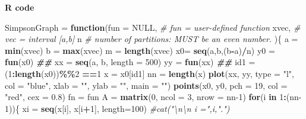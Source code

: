 \documentclass[
]{book}
\newenvironment{Shaded}{\begin{snugshade}}{\end{snugshade}}
\newcommand{\AttributeTok}[1]{\textcolor[rgb]{0.13,0.29,0.53}{#1}}
\newcommand{\CommentTok}[1]{\textcolor[rgb]{0.56,0.35,0.01}{\textit{#1}}}
\newcommand{\ConstantTok}[1]{\textcolor[rgb]{0.56,0.35,0.01}{#1}}
\newcommand{\ControlFlowTok}[1]{\textcolor[rgb]{0.13,0.29,0.53}{\textbf{#1}}}
\newcommand{\DecValTok}[1]{\textcolor[rgb]{0.00,0.00,0.81}{#1}}
\newcommand{\DocumentationTok}[1]{\textcolor[rgb]{0.56,0.35,0.01}{\textbf{\textit{#1}}}}
\newcommand{\FloatTok}[1]{\textcolor[rgb]{0.00,0.00,0.81}{#1}}
\newcommand{\FunctionTok}[1]{\textcolor[rgb]{0.13,0.29,0.53}{\textbf{#1}}}
\newcommand{\NormalTok}[1]{#1}
\newcommand{\OtherTok}[1]{\textcolor[rgb]{0.56,0.35,0.01}{#1}}
\newcommand{\SpecialCharTok}[1]{\textcolor[rgb]{0.81,0.36,0.00}{\textbf{#1}}}
\newcommand{\StringTok}[1]{\textcolor[rgb]{0.31,0.60,0.02}{#1}}
\begin{document}
\textbf{R code}

\begin{Shaded}
\begin{Highlighting}[]
\NormalTok{SimpsonGraph }\OtherTok{=} \ControlFlowTok{function}\NormalTok{(}\AttributeTok{fun =} \ConstantTok{NULL}\NormalTok{,     }\CommentTok{\# fun = user{-}defined function}
\NormalTok{                        xvec,           }\CommentTok{\# vec = interval [a,b]}
\NormalTok{                        n               }\CommentTok{\# number of partitions: MUST be an even number. }
\NormalTok{                        )\{}
\NormalTok{  a }\OtherTok{=} \FunctionTok{min}\NormalTok{(xvec)}
\NormalTok{  b }\OtherTok{=} \FunctionTok{max}\NormalTok{(xvec)}
\NormalTok{  m }\OtherTok{=} \FunctionTok{length}\NormalTok{(xvec)}
\NormalTok{  x0}\OtherTok{=} \FunctionTok{seq}\NormalTok{(a,b,(b}\SpecialCharTok{{-}}\NormalTok{a)}\SpecialCharTok{/}\NormalTok{n)}
\NormalTok{  y0 }\OtherTok{=} \FunctionTok{fun}\NormalTok{(x0)}
  \DocumentationTok{\#\#}
\NormalTok{  xx }\OtherTok{=} \FunctionTok{seq}\NormalTok{(a, b, }\AttributeTok{length =} \DecValTok{500}\NormalTok{)}
\NormalTok{  yy }\OtherTok{=} \FunctionTok{fun}\NormalTok{(xx)}
  \DocumentationTok{\#\#}
\NormalTok{  id1 }\OtherTok{=}\NormalTok{ (}\DecValTok{1}\SpecialCharTok{:}\FunctionTok{length}\NormalTok{(x0))}\SpecialCharTok{\%\%}\DecValTok{2} \SpecialCharTok{==}\DecValTok{1}
\NormalTok{  x }\OtherTok{=}\NormalTok{ x0[id1]}
\NormalTok{  nn }\OtherTok{=} \FunctionTok{length}\NormalTok{(x)}
  \FunctionTok{plot}\NormalTok{(xx, yy, }\AttributeTok{type =} \StringTok{"l"}\NormalTok{, }\AttributeTok{col =} \StringTok{"blue"}\NormalTok{, }\AttributeTok{xlab =} \StringTok{""}\NormalTok{, }\AttributeTok{ylab =} \StringTok{""}\NormalTok{, }\AttributeTok{main =} \StringTok{""}\NormalTok{)}
  \FunctionTok{points}\NormalTok{(x0, y0, }\AttributeTok{pch =} \DecValTok{19}\NormalTok{, }\AttributeTok{col =} \StringTok{"red"}\NormalTok{, }\AttributeTok{cex =} \FloatTok{0.8}\NormalTok{)}
\NormalTok{  fn }\OtherTok{=}\NormalTok{ fun}
\NormalTok{  A }\OtherTok{=} \FunctionTok{matrix}\NormalTok{(}\DecValTok{0}\NormalTok{, }\AttributeTok{ncol =} \DecValTok{3}\NormalTok{, }\AttributeTok{nrow =}\NormalTok{ nn}\DecValTok{{-}1}\NormalTok{)}
  \ControlFlowTok{for}\NormalTok{(i }\ControlFlowTok{in} \DecValTok{1}\SpecialCharTok{:}\NormalTok{(nn}\DecValTok{{-}1}\NormalTok{))\{}
\NormalTok{    xi }\OtherTok{=} \FunctionTok{seq}\NormalTok{(x[i], x[i}\SpecialCharTok{+}\DecValTok{1}\NormalTok{], }\AttributeTok{length=}\DecValTok{100}\NormalTok{)}
    \CommentTok{\#cat("\textbackslash{}n\textbackslash{}n i =",i,".")}

\end{Highlighting}
\end{Shaded}
\end{document}
